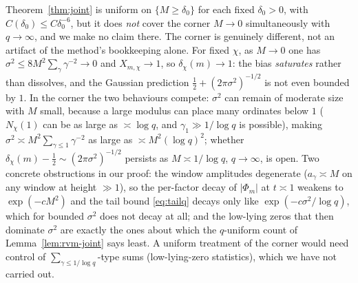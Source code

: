 \begin{remark}\label{rem:joint-corner}
Theorem~\ref{thm:joint} is uniform on $\{M\ge\delta_0\}$ for each
fixed $\delta_0>0$, with $C(\delta_0)\le C\delta_0^{-6}$, but it does
\emph{not} cover the corner $M\to0$ simultaneously with $q\to\infty$,
and we make no claim there. The corner is genuinely different, not an
artifact of the method's bookkeeping alone. For fixed $\chi$, as
$M\to0$ one has $\sigma^2\le8M^2\sum_\gamma\gamma^{-2}\to0$ and
$X_{m,\chi}\to1$, so $\delta_\chi(m)\to1$: the bias \emph{saturates}
rather than dissolves, and the Gaussian prediction
$\tfrac12+(2\pi\sigma^2)^{-1/2}$ is not even bounded by $1$. In the
corner the two behaviours compete: $\sigma^2$ can remain of moderate
size with $M$ small, because a large modulus can place many ordinates
below $1$ ($N_\chi(1)$ can be as large as $\asymp\log q$, and
$\gamma_1\gg1/\log q$ is possible), making
$\sigma^2\asymp M^2\sum_{\gamma\le1}\gamma^{-2}$ as large as
$\asymp M^2(\log q)^2$; whether
$\delta_\chi(m)-\tfrac12\sim(2\pi\sigma^2)^{-1/2}$ persists as
$M\asymp1/\log q$, $q\to\infty$, is open. Two concrete obstructions in
our proof: the window amplitudes degenerate ($a_\gamma\asymp M$ on any
window at height $\gg1$), so the per-factor decay of $|\Phi_m|$ at
$t\asymp1$ weakens to $\exp(-cM^2)$ and the tail bound
\eqref{eq:tailq} decays only like $\exp(-c\sigma^2/\log q)$, which for
bounded $\sigma^2$ does not decay at all; and the low-lying zeros that
then dominate $\sigma^2$ are exactly the ones about which the
$q$-uniform count of Lemma~\ref{lem:rvm-joint} says least. A uniform
treatment of the corner would need control of
$\sum_{\gamma\le1/\log q}$-type sums (low-lying-zero statistics),
which we have not carried out.
\end{remark}

